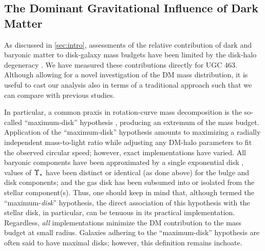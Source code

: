 \documentclass[apj,iop,numberedappendix]{emulateapj}
\begin{document}
\subsection{The Dominant Gravitational Influence of Dark Matter}
\label{sec:dvb}

As discussed in \sect \ref{sec:intro}, assessments of the relative contribution
of dark and baryonic matter to disk-galaxy mass budgets have been limited by the
disk-halo degeneracy \citep{1985ApJ...295..305V}.  We have measured these
contributions directly for UGC 463.  Although allowing for a novel investigation
of the DM mass distribution, it is useful to cast our analysis also in terms of
a traditional approach such that we can compare with previous studies.

In particular, a common praxis in rotation-curve mass decomposition is the
so-called ``maximum-disk'' hypothesis ,
producing an extremum of the mass budget.  Application of the ``maximum-disk''
hypothesis amounts to maximizing a radially independent mass-to-light ratio
while adjusting any DM-halo parameters to fit the observed circular speed;
however, exact implementations have varied.  All baryonic components have been
approximated by a single exponential disk \citep[as in][]{1985ApJ...295..305V},
values of $\Upsilon_\ast$ have been distinct \citep[as in, e.g.,][]{1986AJ.....91.1301K,
1987AJ.....93..816K} or identical (as done above) for the bulge and disk
components; and the gas disk has been subsumed into or isolated from the stellar
component(s).  Thus, one should keep in mind that, although termed the
``maximum-{\it disk}'' hypothesis, the direct association of this hypothesis
with the stellar disk, in particular, can be tenuous in its practical
implementation.  Regardless, {\it all} implementations minimize the DM
contribution to the mass budget at small radius.  Galaxies adhering to the
``maximum-disk'' hypothesis are often said to have maximal disks; however, this
definition remains inchoate.
\end{document}
